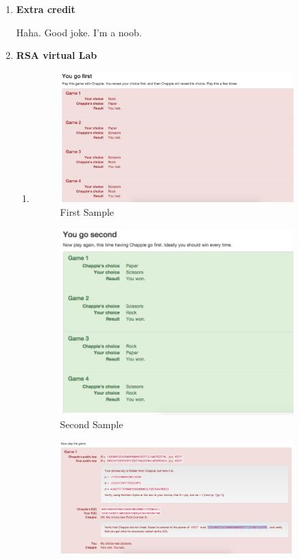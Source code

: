 \documentclass[12pt,fleqn]{article}
\begin{document}
\begin{enumerate}
  \newpage
  \item \textbf{Extra credit}

	Haha. Good joke. I'm a noob.
  
  
  \newpage
  \item \textbf{RSA virtual Lab}
  \begin{enumerate}
    \item[]
    		\begin{figure}[ht!]
			\centering
			\includegraphics[width=90mm]{image1.png}
			\caption{First Sample \label{overflow}}
		\end{figure}
		\begin{figure}[ht!]
			\centering
			\includegraphics[width=90mm]{image2.png}
			\caption{Second Sample \label{overflow}}
		\end{figure}
		\begin{figure}[ht!]
			\centering
			\includegraphics[width=90mm]{image3.png}

\end{figure}
\end{enumerate}
\end{enumerate}
\end{document}

